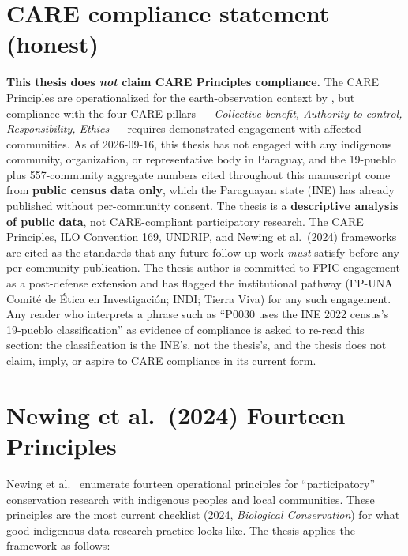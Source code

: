 \section{CARE compliance statement (honest)}

\noindent\textbf{This thesis does \emph{not} claim CARE Principles
compliance.} The CARE Principles
\citep{gida2019,carroll2020care,jennings2025} are operationalized
for the earth-observation context by \citet{jennings2025}, but
compliance with the four CARE pillars --- \emph{Collective benefit,
Authority to control, Responsibility, Ethics} --- requires
demonstrated engagement with affected communities. As of
2026-09-16, this thesis has not engaged with any indigenous
community, organization, or representative body in Paraguay, and
the 19-pueblo plus 557-community aggregate numbers cited throughout
this manuscript come from \textbf{public census data only}, which
the Paraguayan state (INE) has already published without per-community
consent. The thesis is a \textbf{descriptive analysis of public
data}, not CARE-compliant participatory research. The CARE
Principles, ILO Convention 169, UNDRIP, and Newing et al.\ (2024)
frameworks are cited as the standards that any future
follow-up work \emph{must} satisfy before any per-community
publication. The thesis author is committed to FPIC engagement
as a post-defense extension and has flagged the institutional
pathway (FP-UNA Comité de Ética en Investigación; INDI; Tierra
Viva) for any such engagement. Any reader who interprets a
phrase such as ``P0030 uses the INE 2022 census's 19-pueblo
classification'' as evidence of compliance is asked to re-read
this section: the classification is the INE's, not the thesis's,
and the thesis does not claim, imply, or aspire to CARE compliance
in its current form.

\section{Newing et al.\ (2024) Fourteen Principles}

Newing et al.\ \citep{newing2024} enumerate fourteen operational
principles for ``participatory'' conservation research with
indigenous peoples and local communities. These principles are
the most current checklist (2024, \emph{Biological Conservation})
for what good indigenous-data research practice looks like. The
thesis applies the framework as follows:

